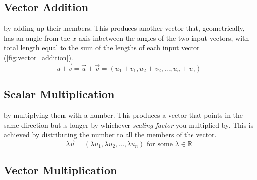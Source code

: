 \documentclass{tufte-book}
\begin{document}
\subsection{Vector Addition}

 by adding up their members. This produces another vector that, geometrically,
has an angle from the $x$ axis inbetween the angles of the two input vectors, with total length equal to the sum of
the lengths of each input vector
(\cref{fig:vector_addition}).
\begin{equation*}
	\overrightarrow{u+v}=\vec{u}+\vec{v}=(u_1+v_1,u_2+v_2,...,u_n+v_n)
\end{equation*}

\begin{marginfigure}[+1cm]
	\caption{$\vec{u}=(1,2), \vec{v}=(3,1) \text{ and } \overrightarrow{u+v}=(4,3)$}
	\label{fig:vector_addition}
\end{marginfigure}

\subsection{Scalar Multiplication}

 by multiplying them with a number. This produces a vector that points in the same
direction but is longer by whichever \emph{scaling factor} you multiplied by. This is achieved by distributing
the number to all the members of the vector.
\begin{equation*}
	\lambda \vec{u} = (\lambda u_1, \lambda u_2, ..., \lambda u_n) \text{ for some }\lambda \in \mathbb{R}
\end{equation*}

\subsection{Vector Multiplication}
\end{document}

